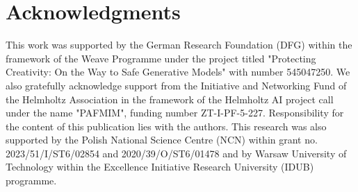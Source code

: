 \section*{Acknowledgments}
This work was supported by the German Research Foundation (DFG) within the framework of the Weave Programme under the project titled "Protecting Creativity: On the Way to Safe Generative Models" with number 545047250. We also gratefully acknowledge support from the Initiative and Networking Fund of the Helmholtz Association in the framework of the Helmholtz AI project call under the name "PAFMIM", funding number ZT-I-PF-5-227. Responsibility for the content of this publication lies with the authors. This research was also supported by the Polish National Science Centre (NCN) within grant no. 2023/51/I/ST6/02854 and 2020/39/O/ST6/01478 and by Warsaw University of Technology within the Excellence Initiative Research University (IDUB) programme.